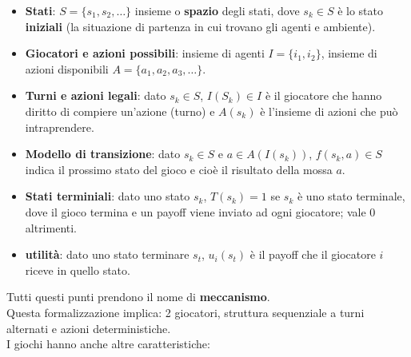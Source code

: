\documentclass{article}
\begin{document}
\begin{itemize}
    \item \textbf{Stati}: $S=\{s_1,s_2,\dots\}$ insieme o \textbf{spazio} degli stati, dove $s_k \in S$ è lo stato \textbf{iniziali} (la situazione di partenza in cui trovano gli agenti e ambiente).
    \item \textbf{Giocatori e azioni possibili}: insieme di agenti $I=\{i_1,i_2\}$, insieme di azioni disponibili $A=\{a_1,a_2,a_3,\dots\}$.
    \item \textbf{Turni e azioni legali}: dato $s_k \in S$, $I(S_k)\in I$ è il giocatore che hanno diritto di compiere un'azione (turno) e $A(s_k)$ è l'insieme di azioni che può intraprendere.
    \item \textbf{Modello di transizione}: dato $s_k \in S$ e $a \in A(I(s_k))$, $f(s_k,a)\in S$ indica il prossimo stato del gioco e cioè il risultato della mossa $a$.
    \item \textbf{Stati terminiali}: dato uno stato $s_k$, $T(s_k)=1$ se $s_k$ è uno stato terminale, dove il gioco termina e un payoff viene inviato ad ogni giocatore; vale 0 altrimenti.
    \item \textbf{utilità}: dato uno stato terminare $s_t$, $u_i(s_t)$ è il payoff che il giocatore $i$ riceve in quello stato.
\end{itemize} 
Tutti questi punti prendono il nome di \textbf{meccanismo}.
\\ Questa formalizzazione implica: 2 giocatori, struttura sequenziale a turni alternati e azioni deterministiche.
\\ I giochi hanno anche altre caratteristiche:
\end{document}
